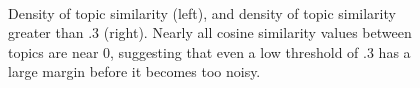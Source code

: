 \documentclass[10pt]{article}
\begin{document}
   
\begin{figure}
\centering
\mbox{
}
\caption{Density of topic similarity (left), and density of topic similarity greater than .3 (right).  Nearly all cosine similarity values between topics are near 0, suggesting that even a low threshold of .3 has a large margin before it becomes too noisy.}
\end{figure}
\end{document}
